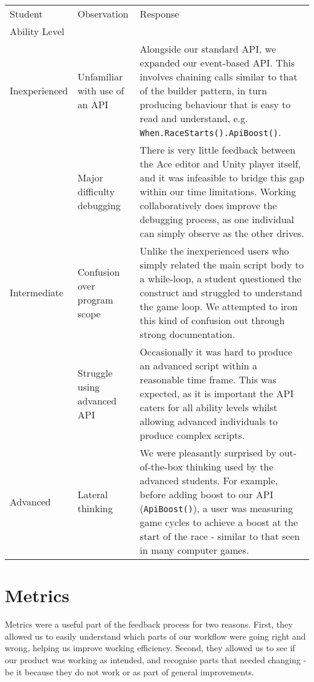 \begin{tabularx}{\textwidth}{ | X | X | p{} |}
\hline
Student & Observation & Response\\
Ability Level & & \\
\hline\hline
Inexperienced 
& Unfamiliar with use of an API 
	& Alongside our standard API, we expanded our event-based API. This involves chaining calls similar to that of the builder pattern, in turn producing behaviour that is easy to read and understand, e.g. {\tt When.RaceStarts().ApiBoost()}. \\ \cline{2-3}
& Major difficulty debugging 
	& There is very little feedback between the Ace editor and Unity player itself, and it was infeasible to bridge this gap within our time limitations. Working collaboratively does improve the debugging process, as one individual can simply observe as the other drives.\\  \hline
Intermediate 
& Confusion over program scope 
	& Unlike the inexperienced users who simply related the main script body to a while-loop, a student questioned the construct and struggled to understand the game loop. We attempted to iron this kind of confusion out through strong documentation. \\ \cline{2-3}
& Struggle using advanced API 
	& Occasionally it was hard to produce an advanced script within a reasonable time frame. This was expected, as it is important the API caters for all ability levels whilst allowing advanced individuals to produce complex scripts.\\ \hline
Advanced 
& Lateral thinking 
	& We were pleasantly surprised by out-of-the-box thinking used by the advanced students. For example, before adding boost to our API ({\tt ApiBoost()}), a user was measuring game cycles to achieve a boost at the start of the race - similar to that seen in many computer games.  \\
\hline
\end{tabularx}

\section{Metrics}
Metrics were a useful part of the feedback process for two reasons. First, they allowed us to easily understand which parts of our workflow were going right and wrong, helping us improve working efficiency. Second, they allowed us to see if our product was working as intended, and recognise parts that needed changing - be it because they do not work or as part of general improvements.

